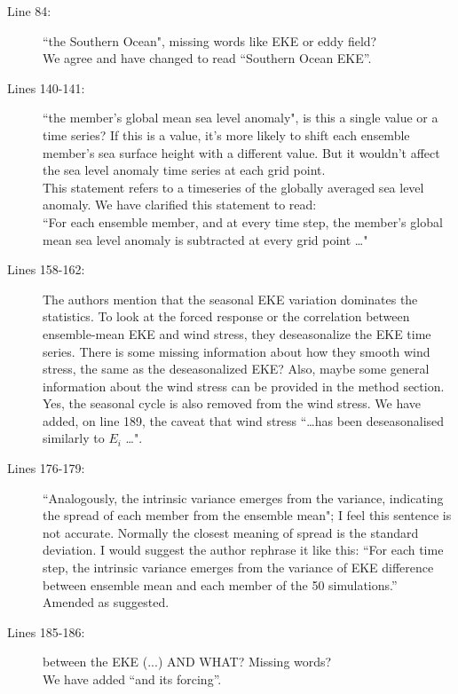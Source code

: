 \documentclass[11pt]{article}
\begin{document}
{\color{blue} 
\begin{description}
\item[ Line 84: ] ``the Southern Ocean", missing words like EKE or eddy field?\\
{\color{black}  We agree and have changed to read ``Southern Ocean EKE''.}

\item[ Lines 140-141:] ``the member's global mean sea level anomaly", is this a single value or a time series? If this is a value, it's more likely to shift each ensemble member's sea surface height with a different value. But it wouldn't affect the sea level anomaly time series at each grid point. \\
{\color{black} This statement refers to a timeseries of the globally averaged sea level anomaly. We have clarified this statement to read:\\
 ``For each ensemble member, and at every time step, the member's global mean sea level anomaly is subtracted at every grid point  \ldots" }

\item[Lines 158-162:] The authors mention that the seasonal EKE variation dominates the statistics. To look at the forced response or the correlation between ensemble-mean EKE and wind stress, they deseasonalize the EKE time series. There is some missing information about how they smooth wind stress, the same as the deseasonalized EKE? Also, maybe some general information about the wind stress can be provided in the method section.\\
{\color{black} Yes, the seasonal cycle is also removed from the wind stress. We have added, on line 189, the caveat that wind stress ``\ldots has been deseasonalised similarly to $E_i$ \ldots". }

\item[Lines 176-179:] ``Analogously, the intrinsic variance emerges from the variance, indicating the spread of each member from the ensemble mean"; I feel this sentence is not accurate. Normally the closest meaning of spread is the standard deviation. I would suggest the author rephrase it like this: ``For each time step, the intrinsic variance emerges from the variance of EKE difference between ensemble mean and each member of the 50 simulations.'' \\
{\color{black} Amended as suggested. }

\item[Lines 185-186:] between the EKE (...) AND WHAT? Missing words?\\
{\color{black} We have added ``and its forcing''. }


\end{description}}
\end{document}
